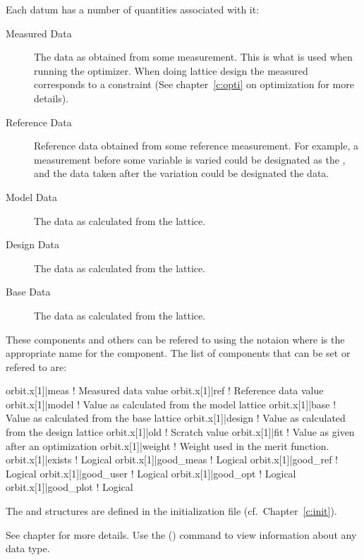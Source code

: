 Each datum has a number of quantities associated with it:
  \vspace*{-2ex}
  \begin{description}
  \item[Measured Data] \Newline 
The data as obtained from some measurement. This is what is used when
running the optimizer.  When doing lattice design the measured
 corresponds to a constraint (See chapter~\ref{c:opti} on
optimization for more details).
  \item[Reference Data] \Newline
Reference data obtained from some reference measurement. For example,
a measurement before some variable is varied could be designated as
the , and the data taken after the variation could be 
designated the  data.
  \item[Model Data] \Newline
The data as calculated from the  lattice.
  \item[Design Data] \Newline
The data as calculated from the  lattice.
  \item[Base Data] \Newline
The data as calculated from the  lattice.
  \end{description}
These components and others can be refered to using the notaion
 where  is the appropriate name for the
component. The list of components that can be set or refered to are:
\begin{example}
  orbit.x[1]|meas      ! Measured data value
  orbit.x[1]|ref       ! Reference data value
  orbit.x[1]|model     ! Value as calculated from the model lattice
  orbit.x[1]|base      ! Value as calculated from the base lattice
  orbit.x[1]|design    ! Value as calculated from the design lattice
  orbit.x[1]|old       ! Scratch value
  orbit.x[1]|fit       ! Value as given after an optimization
  orbit.x[1]|weight    ! Weight used in the merit function.
  orbit.x[1]|exists    ! Logical
  orbit.x[1]|good_meas ! Logical
  orbit.x[1]|good_ref  ! Logical
  orbit.x[1]|good_user ! Logical
  orbit.x[1]|good_opt  ! Logical
  orbit.x[1]|good_plot ! Logical
\end{example}

The 
and  structures are defined in the \tao initialization
file (cf.~Chapter~\ref{c:init}).  

See chapter  for more details.  Use the  () command to view information about any data type. 

